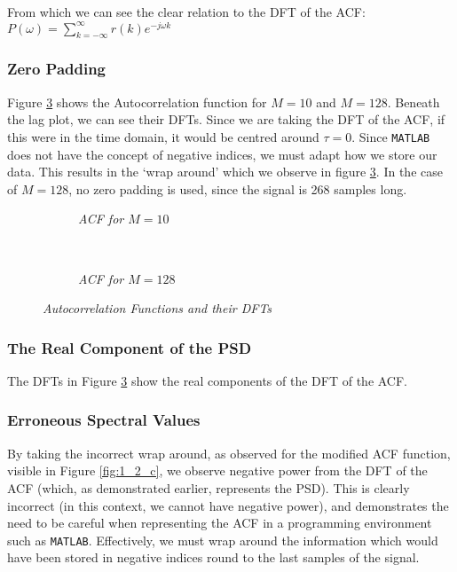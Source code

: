 \documentclass[./main.tex]{subfiles}
\begin{document}
From which we can see the clear relation to the DFT of the ACF: $ P(\omega) = \sum_{k=-\infty}^{\infty} r(k) e^{-j\omega k} $

\subsubsection{Zero Padding}

Figure \ref{fig:1_2_a} shows the Autocorrelation function for $M=10$ and $M=128$. Beneath the lag plot, we can see their DFTs. Since we are taking the DFT of the ACF, if this were in the time domain, it would be centred around $ \tau = 0$. Since \texttt{MATLAB} does not have the concept of negative indices, we must adapt how we store our data. This results in the `wrap around' which we observe in figure \ref{fig:1_2_a}. In the case of $M=128$, no zero padding is used, since the signal is 268 samples long.

\begin{figure}[h]
	\centering
	\begin{subfigure}[b]{0.49\textwidth}
		\resizebox{\textwidth}{!}{}
		\caption{\textit{ACF for $M=10$}}
		\label{fig:1_2_a_10}
	\end{subfigure}
	~ %
	\begin{subfigure}[b]{0.49\textwidth}
		\resizebox{\textwidth}{!}{}
		\caption{\textit{ACF for $M=128$}}
		\label{fig:1_2_a_128}
	\end{subfigure}
	\label{fig:1_2_a}
	\caption{\textit{Autocorrelation Functions and their DFTs}}
\end{figure}

\subsubsection{The Real Component of the PSD}
The DFTs in Figure \ref{fig:1_2_a} show the real components of the DFT of the ACF. 

\subsubsection{Erroneous Spectral Values}

By taking the incorrect wrap around, as observed for the modified ACF function, visible in Figure \ref{fig:1_2_c}, we observe negative power from the DFT of the ACF (which, as demonstrated earlier, represents the PSD). This is clearly incorrect (in this context, we cannot have negative power), and demonstrates the need to be careful when representing the ACF in a programming environment such as \texttt{MATLAB}. Effectively, we must wrap around the information which would have been stored in negative indices round to the last samples of the signal.
\end{document}

